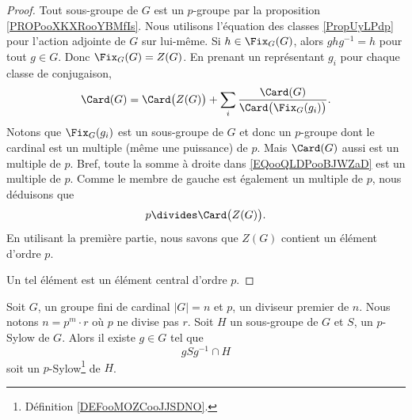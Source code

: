 \begin{proof}
	Tout sous-groupe de \( G\) est un \( p\)-groupe par la proposition \ref{PROPooXKXRooYBMfIs}. Nous utilisons l'équation des classes \ref{PropUyLPdp} pour l'action adjointe de \( G\) sur lui-même. Si \( h\in\Fix_G(G)\), alors \( ghg^{-1}=h\) pour tout \( g\in G\). Donc \( \Fix_G(G)=Z(G)\). En prenant un représentant \( g_i\) pour chaque classe de conjugaison,
	\begin{equation}		\label{EQooQLDPooBJWZaD}
		\Card(G)=\Card\big( Z(G) \big)+\sum_i\frac{ \Card(G) }{ \Card\big( \Fix_G(g_i) \big) }.
	\end{equation}
	Notons que \( \Fix_G(g_i)\) est un sous-groupe de \( G\) et donc un \( p\)-groupe dont le cardinal est un multiple (même une puissance) de \( p\).  Mais \( \Card(G)\) aussi est un multiple de \( p\). Bref, toute la somme à droite dans \eqref{EQooQLDPooBJWZaD} est un multiple de \( p\). Comme le membre de gauche est également un multiple de \( p\), nous déduisons que
	\begin{equation}
		p\divides\Card\big( Z(G) \big).
	\end{equation}
	En utilisant la première partie, nous savons que \( Z(G)\) contient un élément d'ordre \( p\).

	Un tel élément est un élément central d'ordre \( p\).
\end{proof}


\begin{lemma}       \label{LemwDYQMg}
	Soit \( G\), un groupe fini de cardinal \( | G |=n\) et \( p\), un diviseur premier de \( n\). Nous notons \( n=p^m\cdot r\) où \( p\) ne divise pas \( r\). Soit \( H\) un sous-groupe de \( G\) et \( S\), un \( p\)-Sylow de \( G\). Alors il existe \( g\in G\) tel que
	\begin{equation}
		gSg^{-1}\cap H
	\end{equation}
	soit un \( p\)-Sylow\footnote{Définition \ref{DEFooMOZCooJJSDNO}.} de \( H\).
\end{lemma}

